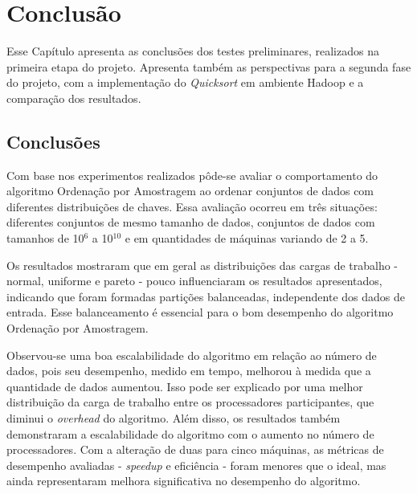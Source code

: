 
\chapter{Conclusão}
\label{cap:conclusao}

Esse Capítulo apresenta as conclusões dos testes preliminares, realizados na primeira etapa do projeto. Apresenta também as perspectivas para a segunda fase do projeto, com a implementação do \textit{Quicksort} em ambiente Hadoop e a comparação dos resultados.

 \section{Conclusões}
 
Com base nos experimentos realizados pôde-se avaliar o comportamento do algoritmo Ordenação por Amostragem ao ordenar conjuntos de dados com 
diferentes distribuições de chaves. Essa avaliação ocorreu em três situações: diferentes conjuntos de mesmo tamanho de dados, conjuntos de dados com tamanhos de 10$^6$ a 10$^{10}$ e em quantidades de máquinas variando de 2 a 5.

Os resultados mostraram que em geral as distribuições das cargas de trabalho - normal, uniforme e pareto - pouco influenciaram os resultados apresentados,  indicando que foram formadas partições balanceadas, independente dos dados de entrada. Esse balanceamento é essencial para o bom desempenho do algoritmo Ordenação por Amostragem. 

Observou-se uma boa escalabilidade do algoritmo em relação ao número de dados, pois seu desempenho, medido em tempo, melhorou à medida que a quantidade de dados aumentou. Isso pode ser explicado por uma melhor distribuição da carga de trabalho entre os processadores participantes, que diminui o  \textit{overhead} do algoritmo.
Além disso, os resultados também demonstraram a escalabilidade do algoritmo com o aumento no número de processadores. Com a alteração de duas para cinco máquinas, as métricas de desempenho avaliadas - \textit{speedup} e eficiência - foram menores que o ideal, mas ainda representaram melhora significativa no desempenho do algoritmo. 

